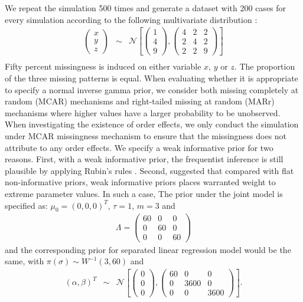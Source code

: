 	We repeat the simulation 500 times and generate a dataset with 200 cases for every simulation according to the following multivariate distribution :
	\begin{eqnarray*}
		\begin{pmatrix}x\\
			y\\
			z
		\end{pmatrix} & \sim & \mathcal{N}\left[\left(\begin{array}{c}
			1\\
			4\\
			9
		\end{array}\right),\left(\begin{array}{ccc}
			4 & 2 & 2\\
			2 & 4 & 2\\
			2 & 2 & 9 
		\end{array}\right)\right]\\
	\end{eqnarray*}
	Fifty percent missingness is induced on either variable $x$, $y$ or $z$. The proportion of the three missing patterns is equal. When evaluating whether it is appropriate to specify a normal inverse gamma prior, we consider both missing completely at random (MCAR) mechanisms and right-tailed missing at random (MARr) mechanisms where higher values have a larger probability to be unobserved. When investigating the existence of order effects, we only conduct the simulation under MCAR missingness mechanism to ensure that the missingness does not attribute to any order effects. We specify a weak informative prior for two reasons. First, with a weak informative prior, the frequentist inference is still plausible by applying Rubin's rules \citep[p. 76]{RubinD1987}. Second, \citet{Goodrich2019} suggested that compared with flat non-informative priors, weak informative priors places warranted weight to extreme parameter values. In such a case, The prior under the joint model is specified as: $\mu_{0} = (0, 0, 0)^T$, $\tau = 1$, $m = 3$ and 
	\begin{eqnarray*}
		\Lambda = \left(\begin{array}{ccc}
			60 & 0 & 0\\
			0 & 60 & 0\\
			0 & 0 & 60 
		\end{array}\right)
	\end{eqnarray*}
	and the corresponding prior for separated linear regression model would be the same, with $\pi(\sigma) \sim W^{-1}(3, 60)$ and 
	\begin{eqnarray*}
		(\alpha, \beta)^T
		& \sim & \mathcal{N}\left[\left(\begin{array}{c}
			0\\
			0\\
			0
		\end{array}\right),\left(\begin{array}{ccc}
			60 & 0 & 0\\
			0 & 3600 & 0\\
			0 & 0 & 3600 
		\end{array}\right)\right].\\
	\end{eqnarray*}

